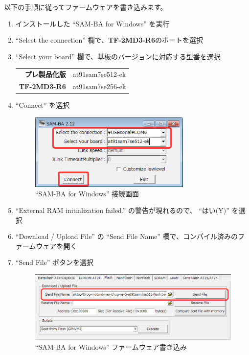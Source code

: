 \documentclass[11pt,a4j,openany]{jbook}
\begin{document}
以下の手順に従ってファームウェアを書き込みます。
\begin{enumerate}
	\item インストールした ``SAM-BA for Windows'' を実行
	\item ``Select the connection'' 欄で、{\bf TF-2MD3-R6}のポートを選択
	\item ``Select your board'' 欄で、基板のバージョンに対応する型番を選択
		\begin{center}
		\begin{tabular}{rl}
			\hline
			{\bf プレ製品化版} & at91sam7se512-ek \\
			{\bf TF-2MD3-R6}   & at91sam7se256-ek \\
			\hline
		\end{tabular}
		\end{center}
	\item ``Connect'' を選択
		\begin{figure}[H]
			\centering\includegraphics[width=80mm]{sam-ba.connect.eps}
			\caption{ ``SAM-BA for Windows'' 接続画面}
			\label{fig:sam-ba.connect}
		\end{figure}
	\item ``External RAM initialization failed.'' の警告が現れるので、 ``はい(Y)'' を選択
	\item ``Download / Upload File'' の ``Send File Name'' 欄で、コンパイル済みのファームウェアを開く
	\item ``Send File'' ボタンを選択
		\begin{figure}[H]
			\centering\includegraphics[width=148mm]{sam-ba.write.eps}
			\caption{ ``SAM-BA for Windows'' ファームウェア書き込み}
			\label{fig:sam-ba.write}
		\end{figure}

\end{enumerate}
\end{document}
